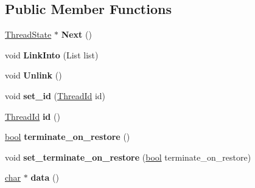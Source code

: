 \subsection*{Public Member Functions}
\begin{DoxyCompactItemize}
\item 
\mbox{\label{classv8_1_1internal_1_1ThreadState_a72a0930797cee81d1c9554b85d823a85}} 
\mbox{\hyperlink{classv8_1_1internal_1_1ThreadState}{Thread\+State}} $\ast$ {\bfseries Next} ()
\item 
\mbox{\label{classv8_1_1internal_1_1ThreadState_a4defafb5b3668efb14f85d77374bbe3b}} 
void {\bfseries Link\+Into} (List list)
\item 
\mbox{\label{classv8_1_1internal_1_1ThreadState_a848a04b06e8f8d3007d96f5c5ef92eca}} 
void {\bfseries Unlink} ()
\item 
\mbox{\label{classv8_1_1internal_1_1ThreadState_a29a5b54da6f9f06155d8a1c8757ad6f7}} 
void {\bfseries set\+\_\+id} (\mbox{\hyperlink{classv8_1_1internal_1_1ThreadId}{Thread\+Id}} id)
\item 
\mbox{\label{classv8_1_1internal_1_1ThreadState_a4ea95e4c29e70027b8f5840cc99c38f0}} 
\mbox{\hyperlink{classv8_1_1internal_1_1ThreadId}{Thread\+Id}} {\bfseries id} ()
\item 
\mbox{\label{classv8_1_1internal_1_1ThreadState_a67d1acd28377f5beca24b338d5d8936e}} 
\mbox{\hyperlink{classbool}{bool}} {\bfseries terminate\+\_\+on\+\_\+restore} ()
\item 
\mbox{\label{classv8_1_1internal_1_1ThreadState_a660e8d9c78ff99c0ae245aa2c162851c}} 
void {\bfseries set\+\_\+terminate\+\_\+on\+\_\+restore} (\mbox{\hyperlink{classbool}{bool}} terminate\+\_\+on\+\_\+restore)
\item 
\mbox{\label{classv8_1_1internal_1_1ThreadState_a12a9a73b486d3393910b402218a10b0d}} 
\mbox{\hyperlink{classchar}{char}} $\ast$ {\bfseries data} ()
\end{DoxyCompactItemize}
